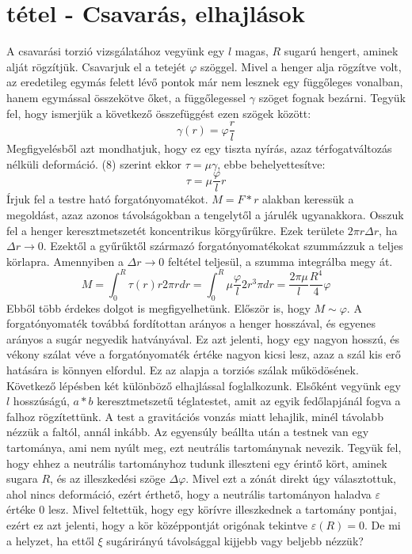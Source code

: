 \documentclass[a4paper,12pt]{article}
\begin{document}
\section{tétel - Csavarás, elhajlások}
A csavarási torzió vizsgálatához vegyünk egy $l$ magas, $R$ sugarú hengert, aminek alját rögzítjük. Csavarjuk el a tetejét $\varphi$ szöggel. Mivel a henger alja rögzítve volt, az eredetileg egymás felett lévő pontok már nem lesznek egy függőleges vonalban, hanem egymással összekötve őket, a függőlegessel $\gamma$ szöget fognak bezárni. Tegyük fel, hogy ismerjük a következő összefüggést ezen szögek között:
\begin{equation}
\gamma(r)=\varphi\frac{r}{l}
\end{equation}
Megfigyelésből azt mondhatjuk, hogy ez egy tiszta nyírás, azaz térfogatváltozás nélküli deformáció. (8) szerint ekkor $\tau=\mu\gamma$, ebbe behelyettesítve:
\begin{equation}
\tau=\mu\frac{\varphi}{l}r
\end{equation}
Írjuk fel a testre ható forgatónyomatékot. $M=F*r$ alakban keressük a megoldást, azaz azonos távolságokban a tengelytől a járulék ugyanakkora. Osszuk fel a henger keresztmetszetét koncentrikus körgyűrűkre. Ezek területe $2\pi r\Delta r$, ha $\Delta r \rightarrow 0$. Ezektől a gyűrűktől származó forgatónyomatékokat szummázzuk a teljes körlapra. Amennyiben a $\Delta r \rightarrow 0$ feltétel teljesül, a szumma integrálba megy át.
\begin{equation}
M=\int_{0}^{R}\tau(r)r2\pi rdr=\int_{0}^{R}\mu\frac{\varphi}{l}2r^3\pi dr=\frac{2\pi\mu}{l}\frac{R^4}{4}\varphi
\end{equation}
Ebből több érdekes dolgot is megfigyelhetünk. Először is, hogy $M\sim\varphi$. A forgatónyomaték továbbá fordítottan arányos a henger hosszával, és egyenes arányos a sugár negyedik hatványával. Ez azt jelenti, hogy egy nagyon hosszú, és vékony szálat véve a forgatónyomaték értéke nagyon kicsi lesz, azaz a szál kis erő hatására is könnyen elfordul. Ez az alapja a torziós szálak működösének. 
Következő lépésben két különböző elhajlással foglalkozunk. Elsőként vegyünk egy $l$ hosszúságú, $a*b$ keresztmetszetű téglatestet, amit az egyik fedőlapjánál fogva a falhoz rögzítettünk. A test a gravitációs vonzás miatt lehajlik, minél távolabb nézzük a faltól, annál inkább. Az egyensúly beállta után a testnek van egy tartománya, ami nem nyúlt meg, ezt neutrális tartománynak nevezik. Tegyük fel, hogy ehhez a neutrális tartományhoz tudunk illeszteni egy érintő kört, aminek sugara $R$, és az illeszkedési szöge $\Delta \varphi$. Mivel ezt a zónát direkt úgy választottuk, ahol nincs deformáció, ezért érthető, hogy a neutrális tartományon haladva $\varepsilon$ értéke 0 lesz. Mivel feltettük, hogy egy körívre illeszkednek a tartomány pontjai, ezért ez azt jelenti, hogy a kör középpontját origónak tekintve $\varepsilon(R)=0$. De mi a helyzet, ha ettől $\xi$ sugárirányú távolsággal kijjebb vagy beljebb nézzük?
\end{document}

